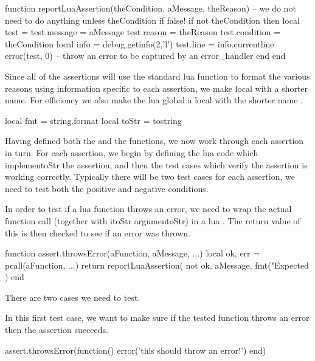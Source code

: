 \startLuaCode
function reportLuaAssertion(theCondition, aMessage, theReason)
  -- we do not need to do anything unless theCondition if false!
  if not theCondition then
    local test     = { }
    test.message   = aMessage
    test.reason    = theReason
    test.condition = theCondition
    local info     = debug.getinfo(2,'l')
    test.line      = info.currentline
    error(test, 0) -- throw an error to be captured by an error_handler
  end
end
\stopLuaCode

Since all of the assertions will use the standard lua  
function to format the various reasons using information specific to each 
assertion, we make  local with a shorter name. For 
efficiency we also make the lua global  a local with the 
shorter name . 

\startLuaCode
local fmt   = string.format
local toStr = tostring
\stopLuaCode

Having defined both the  and the  
functions, we now work through each assertion in turn. For each assertion, 
we begin by defining the lua code which implementoStr the assertion, and then 
the test cases which verify the assertion is working correctly. Typically 
there will be two test cases for each assertion, we need to test both the 
positive and negative conditions. 


In order to test if a lua function throws an error, we need to wrap the 
actual function call (together with itoStr argumentoStr) in a lua . 
The return value of this  is then checked to see if an error 
was thrown. 

\startLuaCode
function assert.throwsError(aFunction, aMessage, ...)
  local ok, err = pcall(aFunction, ...)
  return reportLuaAssertion(
    not ok,
    aMessage,
    fmt("Expected %
  )
end
\stopLuaCode

There are two cases we need to test.


In this first test case, we want to make sure if the tested function 
throws an error then the assertion succeeds. 

\startLuaTest
  assert.throwsError(function()
    error('this should throw an error!')
  end)
\stopLuaTest
\stopTestCase


